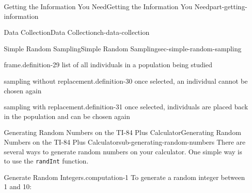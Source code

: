 \documentclass[oneside,10pt,]{book}
\newcommand{\mono}[1]{\texttt{#1}}
\numberwithin{equation}{section}
\newenvironment{codedisplay}
{\VerbatimEnvironment\begin{center}\begin{lrbox}{\codedisplaybox}\begin{BVerbatim}}
{\end{BVerbatim}\end{lrbox}\usebox{\codedisplaybox}\end{center}}
\begin{document}
\begin{partptx}{Getting the Information You Need}{}{Getting the Information You Need}{}{}{part-getting-information}
\begin{chapterptx}{Data Collection}{}{Data Collection}{}{}{ch-data-collection}
\begin{sectionptx}{Simple Random Sampling}{}{Simple Random Sampling}{}{}{sec-simple-random-sampling}
\begin{definition}{frame.}{definition-29}%
list of all individuals in a population being studied\end{definition}
\begin{definition}{sampling without replacement.}{definition-30}%
once selected, an individual cannot be chosen again\end{definition}
\begin{definition}{sampling with replacement.}{definition-31}%
once selected, individuals are placed back in the population and can be chosen again\end{definition}
%
%
\typeout{************************************************}
\typeout{************************************************}
%
\begin{subsectionptx}{Generating Random Numbers on the TI-84 Plus Calculator}{}{Generating Random Numbers on the TI-84 Plus Calculator}{}{}{sub-generating-random-numbers}
\hypertarget{p-9}{}%
There are several ways to generate random numbers on your calculator. One simple way is to use the \mono{randInt} function.%
\begin{computation}{Generate Random Integers.}{computation-1}%
\hypertarget{p-10}{}%
To generate a random integer between 1 and 10:\leavevmode%
\end{computation}
\end{subsectionptx}
\end{sectionptx}
\end{chapterptx}
\end{partptx}
\end{document}
